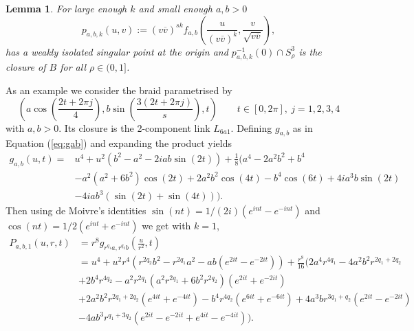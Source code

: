 \documentclass[notitlepage,12pt]{revtex4-1}
\newtheorem{lemma}[theorem]{\bf Lemma}
\begin{document}
\begin{lemma}
\label{weakest}
For large enough $k$ and small enough $a,b>0$ 
\begin{equation}
\label{eq:tildep}
p_{a,b,k}(u,v):=(v\overline{v})^{sk}f_{a,b}\left(\frac{u}{(v\overline{v})^k},\frac{v}{\sqrt{v\overline{v}}}\right),
\end{equation}
has a weakly isolated singular point at the origin and $p_{a,b,k}^{-1}(0)\cap S^{3}_{\rho}$ is the closure of $B$ for all $\rho\in(0,1]$.
\end{lemma}

As an example we consider the braid parametrised by
\begin{equation}
\label{eq:423}
\left(a\cos\left(\frac{2t+2\pi j}{4}\right),b\sin\left(\frac{3(2t+2\pi j)}{s}\right),t\right)\quad\quad t\in [0,2\pi],\ j=1,2,3,4
\end{equation}
with $a,b>0$. Its closure is the 2-component link $L_{6a1}$.
Defining $g_{a,b}$ as in Equation (\ref{eq:gab}) and expanding the product yields
\begin{align}
\label{423exp}
g_{a,b}(u,t)=&u^4+u^2(b^2-a^2-2iab\sin(2t))+\frac{1}{8}(a^4-2a^2b^2+b^4 \nonumber\\
&-a^2(a^2+6b^2)\cos(2t)+2a^2b^2\cos(4t)-b^4\cos(6t)+4ia^3b\sin(2t)\nonumber\\
&-4iab^3(\sin(2t)+\sin(4t))).
\end{align}
Then using de Moivre's identities $\sin(nt)=1/(2i)(e^{int}-e^{-int})$ and $\cos(nt)=1/2 (e^{int}+e^{-int})$ 
we get with $k=1$,
\begin{align}
\label{423subs}
P_{a,b,1}(u,r,t)&=r^{8}g_{r^{q_{1}}a,r^{q_{2}}b}\left(\frac{u}{r^{2}},t\right)\nonumber\\
&=u^4+u^2r^4(r^{2q_{2}}b^2-r^{2q_{1}}a^2-ab(e^{2it}-e^{-2it}))+\frac{r^8}{16}(2a^4r^{4q_{1}}-4a^2b^2r^{2q_{1}+2q_{2}}\nonumber\\
&+2b^4r^{4q_{2}}-a^2r^{2q_{1}}(a^2r^{2q_{1}}+6b^2r^{2q_{2}})(e^{2it}+e^{-2it})\nonumber\\
&+2a^2b^2r^{2q_{1}+2q_{2}}(e^{4it}+e^{-4it})-b^4r^{4q_{2}}(e^{6it}+e^{-6it})+4a^3br^{3q_{1}+q_{2}}(e^{2it}-e^{-2it})\nonumber\\
&-4ab^3r^{q_{1}+3q_{2}}(e^{2it}-e^{-2it}+e^{4it}-e^{-4it})).
\end{align}
\end{document}
